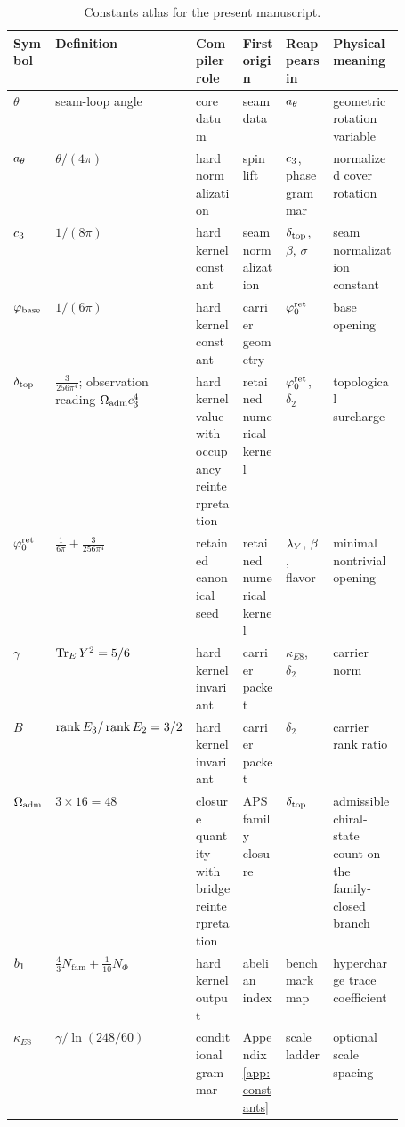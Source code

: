 \begin{table}[t]
\centering
\scriptsize
\setlength{\tabcolsep}{3pt}
\begin{tabularx}{\linewidth}{@{}>{\raggedright\arraybackslash}p{0.10\linewidth}>{\raggedright\arraybackslash}p{0.18\linewidth}>{\raggedright\arraybackslash}p{0.12\linewidth}>{\raggedright\arraybackslash}p{0.11\linewidth}YY@{}}
\toprule
Symbol & Definition & Compiler role & First origin & Reappears in & Physical meaning \\
\midrule
$\theta$ & seam-loop angle & core datum & seam data & $a_\theta$ & geometric rotation variable \\
$a_\theta$ & $\theta/(4\pi)$ & hard normalization & spin lift & $c_3$, phase grammar & normalized cover rotation \\
$c_3$ & $1/(8\pi)$ & hard kernel constant & seam normalization & $\delta_{\mathrm{top}}$, $\beta$, $\sigma$ & seam normalization constant \\
$\varphi_{\mathrm{base}}$ & $1/(6\pi)$ & hard kernel constant & carrier geometry & $\varphi_0^{\mathrm{ret}}$ & base opening \\
$\delta_{\mathrm{top}}$ & $\frac{3}{256\pi^4}$; observation reading $\Omega_{\mathrm{adm}}c_3^4$ & hard kernel value with occupancy reinterpretation & retained numerical kernel & $\varphi_0^{\mathrm{ret}}$, $\delta_2$ & topological surcharge \\
$\varphi_0^{\mathrm{ret}}$ & $\frac{1}{6\pi}+\frac{3}{256\pi^4}$ & retained canonical seed & retained numerical kernel & $\lambda_Y$, $\beta$, flavor & minimal nontrivial opening \\
$\gamma$ & $\operatorname{Tr}_EY^2=5/6$ & hard kernel invariant & carrier packet & $\kappa_{E8}$, $\delta_2$ & carrier norm \\
$B$ & $\operatorname{rank} E_3/\operatorname{rank} E_2=3/2$ & hard kernel invariant & carrier packet & $\delta_2$ & carrier rank ratio \\
$\Omega_{\mathrm{adm}}$ & $3\times16=48$ & closure quantity with bridge reinterpretation & APS family closure & $\delta_{\mathrm{top}}$ & admissible chiral-state count on the family-closed branch \\
$b_1$ & $\frac43N_{\mathrm{fam}}+\frac1{10}N_\Phi$ & hard kernel output & abelian index & benchmark map & hypercharge trace coefficient \\
$\kappa_{E8}$ & $\gamma/\ln(248/60)$ & conditional grammar & Appendix~\ref{app:constants} & scale ladder & optional scale spacing \\
\bottomrule
\end{tabularx}
\caption{Constants atlas for the present manuscript.}
\label{tab:constants-atlas}
\end{table}

